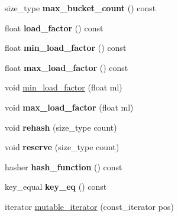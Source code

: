 \begin{DoxyCompactItemize}
\mbox{\label{classtsl_1_1robin__map_a69155fc70ea3d6887fa90a48ffb9bd3d}} 
size\+\_\+type {\bfseries max\+\_\+bucket\+\_\+count} () const
\item 
\mbox{\label{classtsl_1_1robin__map_a026a2c4cb29290d42d410f409b44ec7c}} 
float {\bfseries load\+\_\+factor} () const
\item 
\mbox{\label{classtsl_1_1robin__map_a03e6ecde5671971af02348e2059f9a7a}} 
float {\bfseries min\+\_\+load\+\_\+factor} () const
\item 
\mbox{\label{classtsl_1_1robin__map_a90603aafb683e936dbad92c585ccdeab}} 
float {\bfseries max\+\_\+load\+\_\+factor} () const
\item 
void \mbox{\hyperlink{classtsl_1_1robin__map_a8d8531a86434e6d837cb71c938be56f5}{min\+\_\+load\+\_\+factor}} (float ml)
\item 
\mbox{\label{classtsl_1_1robin__map_ac98a20f47db5ad7fcecf22adec84c422}} 
void {\bfseries max\+\_\+load\+\_\+factor} (float ml)
\item 
\mbox{\label{classtsl_1_1robin__map_a46f1634ce93a6e4913ae089400de23d2}} 
void {\bfseries rehash} (size\+\_\+type count)
\item 
\mbox{\label{classtsl_1_1robin__map_ad00d46cf38f14cfecc95079ad3a3e4df}} 
void {\bfseries reserve} (size\+\_\+type count)
\item 
\mbox{\label{classtsl_1_1robin__map_a7e4e486e49dd234f8c00d952ae1b148c}} 
hasher {\bfseries hash\+\_\+function} () const
\item 
\mbox{\label{classtsl_1_1robin__map_a3eb7a3b0e39f83debd0572fab100d178}} 
key\+\_\+equal {\bfseries key\+\_\+eq} () const
\item 
iterator \mbox{\hyperlink{classtsl_1_1robin__map_a4250011f568c4ebedee82aa93f94657f}{mutable\+\_\+iterator}} (const\+\_\+iterator pos)
\end{DoxyCompactItemize}
